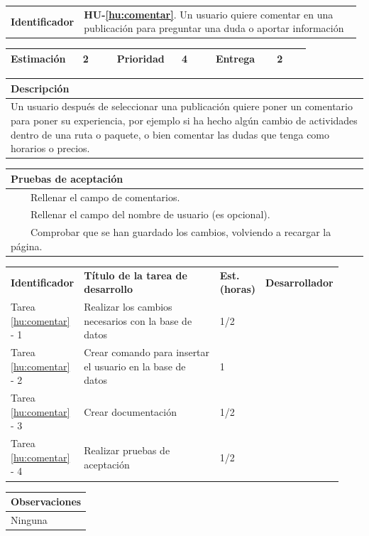 \documentclass[11pt]{article}
\newcommand{\tabitem}{~~\llap{\textbullet}~~}
\begin{document}
\begin{longtable}{p{0.18\linewidth}|p{0.8\linewidth}}
  \rowcolor{LightCyan}
  \textbf{Identificador} & \textbf{HU-\ref{hu:comentar}}. Un usuario quiere comentar en una publicación para preguntar una duda o aportar información \\  
\end{longtable}
\vspace{-0.8cm}
\begin{longtable}{p{0.18\linewidth}|p{0.1\linewidth}|p{0.18\linewidth}|p{0.1\linewidth}|p{0.18\linewidth}|p{0.1\linewidth}}
	\toprule
	\textbf{Estimación} & 2 & \textbf{Prioridad} & 4 & \textbf{Entrega} & 2 \\
	\bottomrule
\end{longtable}
\vspace{-0.8cm}
\begin{longtable}{p{1.028\linewidth}}
	\textbf{Descripción}\\
	\midrule
	Un usuario después de seleccionar una publicación quiere poner un comentario para poner su experiencia, por ejemplo si ha hecho algún cambio de actividades dentro de una ruta o paquete, o bien comentar las dudas que tenga como horarios o precios. \\
	\bottomrule
\end{longtable}
\vspace{-0.8cm}
\begin{longtable}{p{1.028\linewidth}}
	\textbf{Pruebas de aceptación}\\
	\midrule
	\tabitem Rellenar el campo de comentarios.\\
	\tabitem Rellenar el campo del nombre de usuario (es opcional).\\
	\tabitem Comprobar que se han guardado los cambios, volviendo a recargar la página.\\
\end{longtable}
\vspace{-0.8cm}
\begin{longtable}{p{0.18\linewidth}|p{0.48\linewidth}|p{0.1\linewidth}|p{0.17\linewidth}}
  \toprule
  \textbf{Identificador} & \textbf{Título de la tarea de desarrollo} & \textbf{Est. (horas)} & \textbf{Desarrollador} \\
  Tarea \ref{hu:comentar} - 1 & Realizar los cambios necesarios con la base de datos & 1/2 &\\
  Tarea \ref{hu:comentar} - 2 & Crear comando para insertar el usuario en la base de datos & 1 & \\
  Tarea \ref{hu:comentar} - 3 & Crear documentación & 1/2 & \\
  Tarea \ref{hu:comentar} - 4 & Realizar pruebas de aceptación & 1/2 &  \\
  \bottomrule
\end{longtable}
\vspace{-0.8cm}
\begin{longtable}{p{1.028\linewidth}}
  \textbf{Observaciones}\\
  \midrule
  Ninguna\\
  \bottomrule
\end{longtable}
\end{document}
